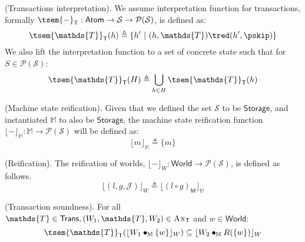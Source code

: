 \param (Transactions interpretation). We assume interpretation function for transactions, formally $\tsem{-}_\mathsf{T} : \mathsf{Atom} \rightarrow \mathcal{S} \rightarrow \mathcal{P}(\mathcal{S})$, is defined as:
\[
	\tsem{\mathds{T}}_\mathsf{T}(h) \triangleq \{ h'\ |\ (h, \mathds{T}) \tred (h', \pskip) \}
\]
We also lift the interpretation function to a set of concrete state such that for $S \in \mathcal{P}(\mathcal{S})$:
\[
	\tsem{\mathds{T}}_\mathsf{T}(H) \triangleq \bigcup_{h \in H}  \tsem{\mathds{T}}_\mathsf{T}(h)
\]	

\param (Machine state reification). Given that we defined the set $\mathcal{S}$ to be $\mathsf{Storage}$, and instantiated $\mathbb{M}$ to also be $\mathsf{Storage}$, the machine state reification function $\lfloor - \rfloor_\mathbb{M} : \mathbb{M} \rightarrow \mathcal{P}(\mathcal{S})$ will be defined as:
\[
	\lfloor m \rfloor_\mathbb{M} \triangleq \{ m \}
\]

 (Reification). The reification of worlds, $\lfloor - \rfloor_W : \mathsf{World} \rightarrow \mathcal{P}(\mathcal{S})$, is defined as follows.
\[
	\lfloor (l, g, \mathcal{J}) \rfloor_W \triangleq \lfloor (l \circ g)_\mathsf{M} \rfloor_\mathbb{M}
\]

\thm (Transaction soundness). For all $\mathds{T} \in \mathsf{Trans}, (W_1, \mathds{T}, W_2) \in \textsc{Ax}_\mathsf{T}$ and $w \in \mathsf{World}$:
\[
	\tsem{\mathds{T}}_\mathsf{T}(\lfloor W_1 \bullet_\mathbb{M} \{ w \} \rfloor_W) \subseteq \lfloor W_2 \bullet_\mathbb{M} R(\{ w \}) \rfloor_W
\]


